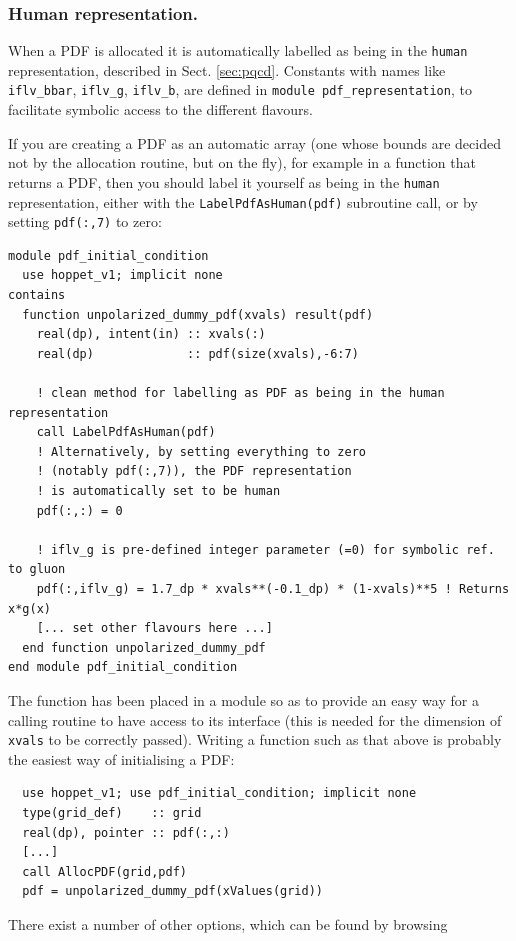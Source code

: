 \documentclass[12pt]{article}
\newcommand{\ttt}[1]{\texttt{#1}}
\begin{document}
\subsubsection{Human representation.}
\label{sec:human-rep}
When a PDF is allocated it is automatically labelled as being in the
\ttt{human} representation, described in
Sect. \ref{sec:pqcd}. Constants with names like
\ttt{iflv\_bbar}, \ttt{iflv\_g}, \ttt{iflv\_b}, are defined in
\ttt{module pdf\_representation}, to facilitate symbolic access to the
different flavours.

If you are creating a PDF as an automatic array (one whose bounds are
decided not by the allocation routine, but on the fly), for example in
a function that returns a PDF, then you should label it yourself as
being in the \ttt{human} representation, either with the
\ttt{LabelPdfAsHuman(pdf)} subroutine call, or by setting
\ttt{pdf(:,7)} to zero:
\begin{lstlisting}
module pdf_initial_condition
  use hoppet_v1; implicit none
contains
  function unpolarized_dummy_pdf(xvals) result(pdf)
    real(dp), intent(in) :: xvals(:)
    real(dp)             :: pdf(size(xvals),-6:7)

    ! clean method for labelling as PDF as being in the human representation
    call LabelPdfAsHuman(pdf)
    ! Alternatively, by setting everything to zero 
    ! (notably pdf(:,7)), the PDF representation
    ! is automatically set to be human
    pdf(:,:) = 0
    
    ! iflv_g is pre-defined integer parameter (=0) for symbolic ref. to gluon
    pdf(:,iflv_g) = 1.7_dp * xvals**(-0.1_dp) * (1-xvals)**5 ! Returns x*g(x)
    [... set other flavours here ...]
  end function unpolarized_dummy_pdf
end module pdf_initial_condition
\end{lstlisting}
The function has been placed in a module so as to provide an easy way
for a calling routine to have access to its interface (this is needed
for the dimension of \ttt{xvals} to be correctly passed).  Writing a
function such as that above is probably the easiest way of
initialising a PDF:
\begin{lstlisting}
  use hoppet_v1; use pdf_initial_condition; implicit none
  type(grid_def)    :: grid
  real(dp), pointer :: pdf(:,:)
  [...]
  call AllocPDF(grid,pdf)
  pdf = unpolarized_dummy_pdf(xValues(grid))
\end{lstlisting}
There exist a number of other options, which can be found by browsing
\end{document}
